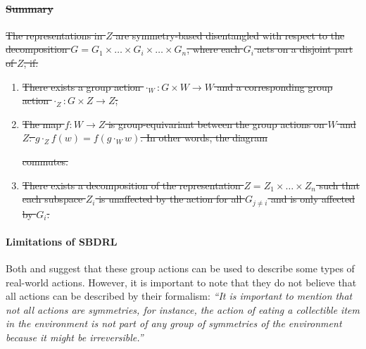 \paragraph{\sout{Summary}}
\sout{
The representations in $Z$ are symmetry-based disentangled with respect to the decomposition $G = G_1 \times \hdots \times G_i \times \hdots \times G_n$, where each $G_i$ acts on a disjoint part of $Z$, if:
}
\begin{enumerate}
    \item \sout{There exists a group action $\cdot_{W}: G \times W \to W$ and a corresponding group action $\cdot_{Z}: G \times Z \to Z$;}
    \item \sout{The map $f : W \to Z$ is group-equivariant between the group actions on $W$ and $Z$: $g \cdot_{Z} f(w) = f(g \cdot_{W} w)$. In other words, the diagram}
    
    \sout{commutes.}

    \item \sout{There exists a decomposition of the representation $Z = Z_1 \times \hdots \times Z_n$ such that each subspace $Z_i$ is unaffected by the action for all $G_{j \neq i}$ and is only affected by $G_i$.}
\end{enumerate}


\paragraph{Limitations of SBDRL}
Both \cite{Higgins2018} and \cite{caselles2019symmetry} suggest that these group actions can be used to describe some types of real-world actions.
However, it is important to note that they do not believe that all actions can be described by their formalism: \textit{``It is important to mention that not all actions are symmetries, for instance, the action of eating a collectible item in the environment is not part of any group of symmetries of the environment because it might be irreversible.''}

